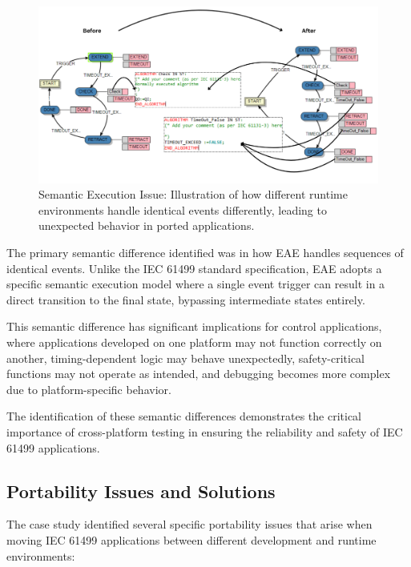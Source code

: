 \begin{figure}[!htbp]
    \centering
    \includegraphics[width=0.99\linewidth]{MX_Papers/Paper10/Figures/SemanticExexcissue.png}
    \caption{Semantic Execution Issue: Illustration of how different runtime environments handle identical events differently, leading to unexpected behavior in ported applications.}
    \label{fig:semantic_issue}
\end{figure}

The primary semantic difference identified was in how EAE handles sequences of identical events. Unlike the IEC 61499 standard specification, EAE adopts a specific semantic execution model where a single event trigger can result in a direct transition to the final state, bypassing intermediate states entirely.

This semantic difference has significant implications for control applications, where applications developed on one platform may not function correctly on another, timing-dependent logic may behave unexpectedly, safety-critical functions may not operate as intended, and debugging becomes more complex due to platform-specific behavior.

The identification of these semantic differences demonstrates the critical importance of cross-platform testing in ensuring the reliability and safety of IEC 61499 applications.

\subsection{Portability Issues and Solutions}

The case study identified several specific portability issues that arise when moving IEC 61499 applications between different development and runtime environments:

